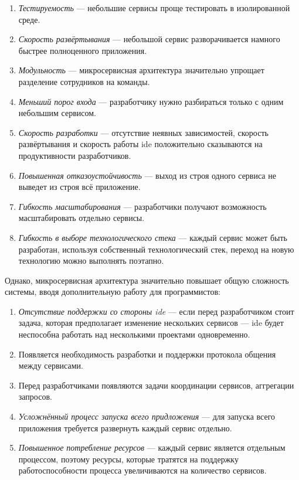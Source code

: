 \begin{enumerate}
	\item \emph{Тестируемость} --- небольшие сервисы проще тестировать в изолированной среде.
	\item \emph{Скорость развёртывания} --- небольшой сервис разворачивается намного быстрее полноценного приложения.
	\item \emph{Модульность} --- микросервисная архитектура значительно упрощает разделение сотрудников на команды.
	\item \emph{Меньший порог входа} --- разработчику нужно разбираться только с одним небольшим сервисом.
	\item \emph{Скорость разработки} --- отсутствие неявных зависимостей, скорость развёртывания и скорость работы \gls{ide} положительно сказываются на продуктивности разработчиков.
	\item \emph{Повышенная отказоустойчивость} --- выход из строя одного сервиса не выведет из строя всё приложение.
	\item \emph{Гибкость масштабирования} --- разработчики получают возможность масштабировать отдельно сервисы.
	\item \emph{Гибкость в выборе технологического стека} --- каждый сервис может быть разработан, используя собственный технологический стек, переход на новую технологию можно выполнять поэтапно.
\end{enumerate}

Однако, микросервисная архитектура значительно повышает общую сложность системы, вводя дополнительную работу для программистов:

\begin{enumerate}
	\item \emph{Отсутствие поддержки со стороны \gls{ide}} --- если перед разработчиком стоит задача, которая предполагает изменение нескольких сервисов --- \gls{ide} будет неспособна работать над несколькими проектами одновременно.
	\item Появляется необходимость разработки и поддержки протокола общения между сервисами.
	\item Перед разработчиками появляются задачи координации сервисов, аггрегации запросов.
	\item \emph{Усложнённый процесс запуска всего придложения} --- для запуска всего приложения требуется развернуть каждый сервис отдельно.
	\item \emph{Повышенное потребление ресурсов} --- каждый сервис является отдельным процессом, поэтому ресурсы, которые тратятся на поддержку работоспособности процесса увеличиваются на количество сервисов.
\end{enumerate}


